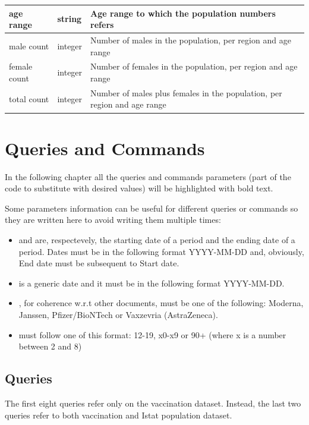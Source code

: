 \documentclass{article}
\begin{document}
\newpage
\begin{center}
\begin{tabular}{ |m{4cm}|m{2cm}|m{4.5cm}|}
\hline
  age range & string & Age range to which the population numbers refers\\ 
    \hline
  male count & integer & Number of males in the population, per region and age range\\
    \hline

  female count & integer & Number of females in the population, per region and age range\\ 
    \hline
  total count & integer & Number of males plus females in the population, per region and age range\\ 
    \hline
  \end{tabular}
\end{center}
\hfill\break

\newpage
\section{Queries and Commands}
In the following chapter all the queries and commands parameters (part of the code to substitute with desired values) will be highlighted with {\color{magenta}{magenta}} bold text.

Some parameters information can be useful for different queries or commands so they are written here to avoid writing them multiple times:
\begin{itemize}
    \item {\color{magenta}{Start date}} and {\color{magenta}{End date}} are, respectevely, the starting date of a period and the ending date of a period. Dates must be in the following format YYYY-MM-DD and, obviously, End date must be subsequent to Start date.
    \item {\color{magenta}{Date}} is a generic date and it must be in the following format YYYY-MM-DD.
    \item {\color{magenta}{Supplier}}, for coherence w.r.t other documents, must be one of the following: Moderna, Janssen, Pfizer/BioNTech or Vaxzevria (AstraZeneca).
    \item {\color{magenta}{Age range}} must follow one of this format: 12-19, x0-x9 or 90+ (where x is a number between 2 and 8)
\end{itemize}
\subsection{Queries}
The first eight queries refer only on the vaccination dataset. Instead, the last two queries refer to both vaccination and Istat population dataset.
\end{document}
